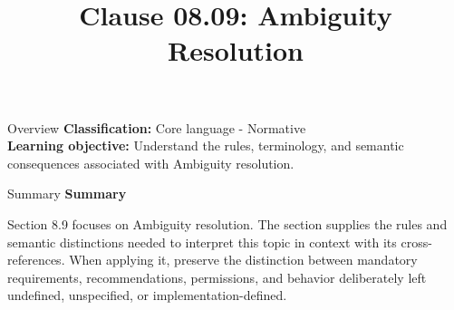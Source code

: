 \documentclass[10pt,letterpaper]{article}
\title{Clause 08.09: Ambiguity Resolution}
\author{}
\date{}
\begin{document}
\maketitle
\begin{CornellOverviewBox}{Overview}
\textbf{Classification:} Core language - Normative\\[2pt]
\textbf{Learning objective:} Understand the rules, terminology, and semantic consequences associated with Ambiguity resolution.
\end{CornellOverviewBox}\begin{CornellSummaryBox}{Summary}
{\sffamily\bfseries\color{Accent} Summary}\par\vspace{3pt}Section 8.9 focuses on Ambiguity resolution. The section supplies the rules and semantic distinctions needed to interpret this topic in context with its cross-references. When applying it, preserve the distinction between mandatory requirements, recommendations, permissions, and behavior deliberately left undefined, unspecified, or implementation-defined.
\end{CornellSummaryBox}
\end{document}
